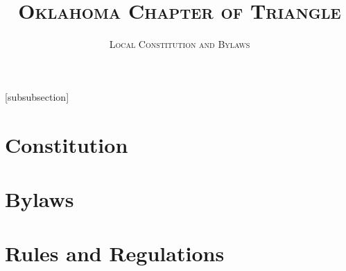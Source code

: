 \documentclass{article}
\title{\textsc{Oklahoma Chapter of Triangle}}
\subtitle{\textsc{Local Constitution and Bylaws}}
\begin{document}
\let\oldsec\section
\let\oldsubsec\subsection
\let\oldsubsubsec\subsubsection
\renewcommand{\part}[1]{\oldsubsec{\textsc{#1}}}
\newcommand{\article}[1]{\oldsubsubsec{\textsc{#1}}}
[subsubsection]
\renewcommand{\section}{
    \stepcounter{ArticleSection}
    \textbf{Section \arabic{ArticleSection}:\ }
}

\setcounter{tocdepth}{3}

\maketitle
\tableofcontents

\setlength\parindent{0pt}
\setlength\parskip{1em}

\pagebreak
\oldsec{Constitution}


\pagebreak
\oldsec{Bylaws}


\oldsec{Rules and Regulations}

\end{document}
